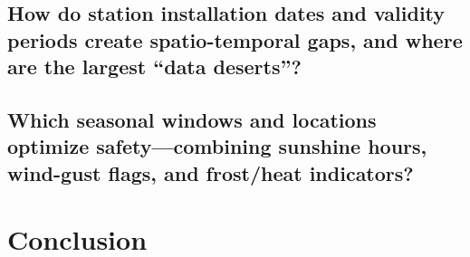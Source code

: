 \documentclass[sigconf]{acmart}
\begin{document}
\subsection{How do station installation dates and validity periods create spatio-temporal gaps, and where are the largest “data deserts”?}


\subsection{Which seasonal windows and locations optimize safety—combining sunshine hours, wind-gust flags, and frost/heat indicators?}


\section{Conclusion}



\end{document}
